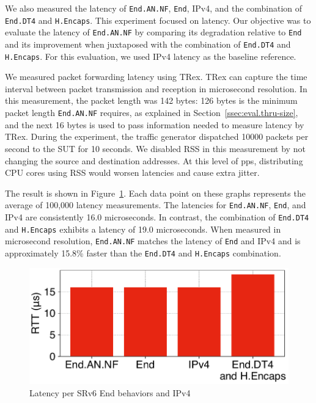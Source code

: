 We also measured the latency of \texttt{End.AN.NF}, \texttt{End}, IPv4, and the combination of \texttt{End.DT4} and \texttt{H.Encaps}.
This experiment focused on latency.
Our objective was to evaluate the latency of \texttt{End.AN.NF} by comparing its degradation relative to \texttt{End} and its improvement when juxtaposed with the combination of \texttt{End.DT4} and \texttt{H.Encaps}.
For this evaluation, we used IPv4 latency as the baseline reference.


We measured packet forwarding latency using TRex.
TRex can capture the time interval between packet transmission and reception in microsecond resolution.
In this measurement, the packet length was 142 bytes: 126 bytes is the minimum packet length \texttt{End.AN.NF} requires, as explained in Section~\ref{ssec:eval.thru-size}, and the next 16 bytes is used to pass information needed to measure latency by TRex.
During the experiment, the traffic generator dispatched 10000 packets per second to the SUT for 10 seconds.
We disabled RSS in this measurement by not changing the source and destination addresses.
At this level of pps, distributing CPU cores using RSS would worsen latencies and cause extra jitter.


The result is shown in Figure~\ref{fig:rtt}.
Each data point on these graphs represents the average of 100,000 latency measurements.
The latencies for \texttt{End.AN.NF}, \texttt{End}, and IPv4 are consistently 16.0 microseconds.
In contrast, the combination of \texttt{End.DT4} and \texttt{H.Encaps} exhibits a latency of 19.0 microseconds.
When measured in microsecond resolution, \texttt{End.AN.NF} matches the latency of \texttt{End} and IPv4 and is approximately 15.8\% faster than the \texttt{End.DT4} and \texttt{H.Encaps} combination.

\begin{figure}[t]
  \centering
  \includegraphics[width=0.95\linewidth]{img/latency.pdf}
  \caption{Latency per SRv6 End behaviors and IPv4}
  \label{fig:rtt}
\end{figure}